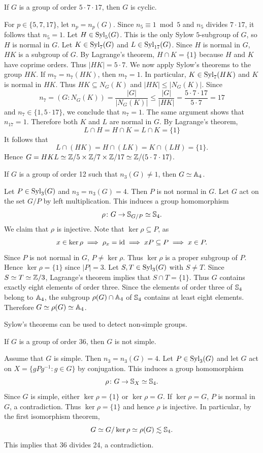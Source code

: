 \begin{example}
If $G$ is a group of order $5\cdot 7\cdot 17$, then $G$ is cyclic.

For $p\in\{5,7,17\}$, let $n_p=n_p(G)$. Since $n_5\equiv 1\bmod 5$ and $n_5$ divides $7\cdot 17$, it follows that 
$n_5=1$. Let $H\in\mathrm{Syl}_5(G)$. This is the only Sylow $5$-subgroup of $G$, 
so $H$ is normal in $G$. Let $K\in\mathrm{Syl}_7(G)$ and $L\in\mathrm{Syl}_{17}(G)$. Since $H$ is normal in $G$, $HK$ is a subgroup of $G$. By Lagrange's theorem, $H\cap K=\{1\}$ because $H$ and $K$ have coprime orders.
Thus  $|HK|=5\cdot 7$.
We now apply Sylow's theorems to the group $HK$. If $m_7=n_7(HK)$, then $m_7=1$. In particular, $K\in\mathrm{Syl}_7(HK)$ and $K$ is normal in $HK$. 
Thus $HK\subseteq N_G(K)$ and $|HK|\leq |N_G(K)|$. Since 
\[
n_7=(G:N_G(K))=\frac{|G|}{|N_G(K)|}\leq \frac{|G|}{|HK|}=\frac{5\cdot 7\cdot 17}{5\cdot 7}=17
\]
and $n_7\in\{1,5\cdot 17\}$, we conclude that
$n_7=1$. The same argument shows that
$n_{17}=1$. Therefore both $K$ and $L$ are normal in $G$. By
Lagrange's theorem, 
\[
L\cap H=H\cap K=L\cap K=\{1\}
\]
It follows that
\[
L\cap (HK)=H\cap (LK)=K\cap (LH)=\{1\}.
\]
Hence $G=HKL\simeq\mathbb{Z}/5\times\mathbb{Z}/7\times\mathbb{Z}/17\simeq\mathbb{Z}/(5\cdot 7\cdot 17)$.
\end{example}


\begin{example}
If $G$ is a group of order 12 such that 
$n_3(G)\ne1$, then $G\simeq\mathbb{A}_4$.

Let $P\in\mathrm{Syl}_3(G)$ and $n_3=n_3(G)=4$. Then $P$ is not normal in
$G$. Let $G$ act on the set $G/P$ by left multiplication. 
This induces a group homomorphism 
\[
\rho\colon G\to\mathbb{S}_{G/P}\simeq\mathbb{S}_4.
\]
We claim that $\rho$ is injective. Note that
$\ker\rho\subseteq P$, as 
\[
x\in\ker\rho\implies
\rho_x=\operatorname{id}\implies
xP\subseteq P\implies
x\in P.
\]
Since $P$ is not normal in $G$, $P\ne \ker\rho$. Thus $\ker\rho$ is a proper subgroup of $P$. Hence 
$\ker\rho=\{1\}$ since $|P|=3$.
Let $S,T\in\mathrm{Syl}_3(G)$ with $S\ne T$. Since $S\simeq T\simeq\mathbb{Z}/3$, Lagrange's theorem implies that $S\cap T=\{1\}$. Thus $G$ 
contains exactly eight elements of order three. 
Since the elements of order three of $\mathbb{S}_4$ belong to $\mathbb{A}_4$, the subgroup $\rho(G)\cap\mathbb{A}_4$ of $\mathbb{S}_4$ contains at least
eight elements. Therefore $G\simeq\rho(G)\simeq\mathbb{A}_4$.
\end{example}

Sylow's theorems can be used to detect non-simple groups. 

\begin{example}
If $G$ is a group of order 36, then $G$ is not simple.

Assume that $G$ is simple. Then $n_3=n_3(G)=4$. 
Let $P\in\mathrm{Syl}_3(G)$ and let $G$ act on $X=\{gPg^{-1}:g\in G\}$ by conjugation. This induces a group homomorphism 
\[
\rho\colon G\to\mathbb{S}_X\simeq\mathbb{S}_4.
\]
Since $G$ is simple, either $\ker\rho=\{1\}$ or $\ker\rho=G$. If $\ker\rho=G$, $P$ is normal in $G$, a
contradiction. Thus $\ker\rho=\{1\}$ and hence
$\rho$ is injective. In particular, 
by the first isomorphism theorem, 
\[
G\simeq G/\ker\rho\simeq\rho(G)\lesssim\mathbb{S}_4.
\]
This implies that 36 divides 24, a contradiction. 
\end{example}

